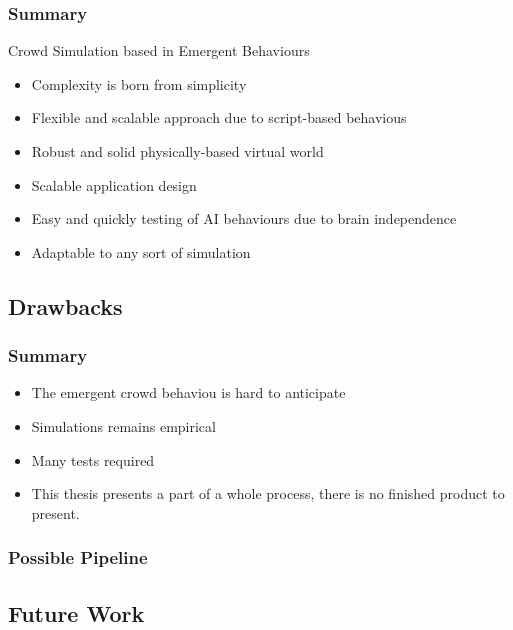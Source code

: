 \documentclass{beamer}
\begin{document}
\begin{frame}
\frametitle{Summary}
  \begin{center}
    \begin{block}{Crowd Simulation based in Emergent Behaviours}
     \begin{itemize}
      \item Complexity is born from simplicity
      \item Flexible and scalable approach due to script-based behavious
      \item Robust and solid physically-based virtual world
      \item Scalable application design
      \item Easy and quickly testing of AI behaviours due to brain independence
      \item Adaptable to any sort of simulation
     \end{itemize}
    \end{block}
  \end{center}
\end{frame}

\subsection{Drawbacks}

\begin{frame}
\frametitle{Summary}
  \begin{center}
     \begin{itemize}
      \item The emergent crowd behaviou is hard to anticipate
      \item Simulations remains empirical
      \item Many tests required
      \item This thesis presents a part of a whole process, there is no finished product to present.
     \end{itemize}
  \end{center}
\end{frame}

\begin{frame}
\frametitle{Possible Pipeline}
\begin{center}
\end{center}
\end{frame}

\subsection{Future Work}
\end{document}
